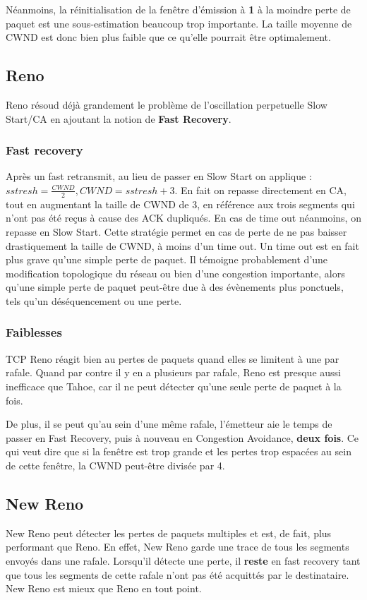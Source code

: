 \documentclass[	DIV=calc,%
							paper=a4,%
							fontsize=11pt,%
							twocolumn]{scrartcl}	 					%
\begin{document}
Néanmoins, la réinitialisation de la fenêtre d'émission à \textbf{1} à la moindre perte de paquet est une sous-estimation beaucoup trop importante. La taille moyenne de CWND est donc bien plus faible que ce qu'elle pourrait être optimalement.


\subsection*{Reno}
Reno résoud déjà grandement le problème de l'oscillation perpetuelle Slow Start/CA en ajoutant la notion de \textbf{Fast Recovery}.

\subsubsection*{Fast recovery}
Après un fast retransmit, au lieu de passer en Slow Start on applique :
$ sstresh=\frac{CWND}{2}, CWND=sstresh+3$. En fait on repasse directement en CA, tout en augmentant la taille de CWND de 3, en référence aux trois segments qui n'ont pas été reçus à cause des ACK dupliqués. En cas de time out néanmoins, on repasse en Slow Start. Cette stratégie permet en cas de perte de ne pas baisser drastiquement la taille de CWND, à moins d'un time out. Un time out est en fait plus grave qu'une simple perte de paquet. Il témoigne probablement d'une modification topologique du réseau ou bien d'une congestion importante, alors qu'une simple perte de paquet peut-être due à des évènements plus ponctuels, tels qu'un déséquencement ou une perte.

\subsubsection*{Faiblesses}
TCP Reno réagit bien au pertes de paquets quand elles se limitent à une par rafale. Quand par contre il y en a plusieurs par rafale, Reno est presque aussi inefficace que Tahoe, car il ne peut détecter qu'une seule perte de paquet à la fois.

De plus, il se peut qu'au sein d'une même rafale, l'émetteur aie le temps de passer en Fast Recovery, puis à nouveau en Congestion Avoidance, \textbf{deux fois}. Ce qui veut dire que si la fenêtre est trop grande et les pertes trop espacées au sein de cette fenêtre, la CWND peut-être divisée par 4.

\subsection*{New Reno}
New Reno peut détecter les pertes de paquets multiples et est, de fait, plus performant que Reno. En effet, New Reno garde une trace de tous les segments envoyés dans une rafale. Lorsqu'il détecte une perte, il \textbf{reste} en fast recovery tant que tous les segments de cette rafale n'ont pas été acquittés par le destinataire. New Reno est mieux que Reno en tout point.
\end{document}

